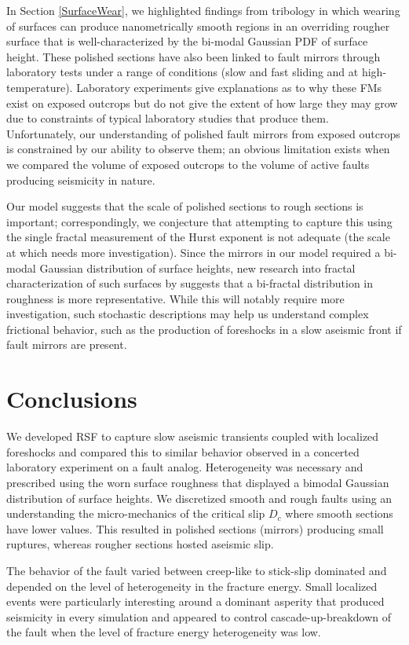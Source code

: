 \documentclass[preprint,1p, 10pt,authoryear]{elsarticle}
\begin{document}
In Section \ref{SurfaceWear}, we highlighted findings from tribology in which wearing of surfaces can produce nanometrically smooth regions in an overriding rougher surface that is well-characterized by the bi-modal Gaussian PDF of surface height. These polished sections have also been linked to fault mirrors through laboratory tests under a range of conditions (slow and fast sliding and at high-temperature). Laboratory experiments give explanations as to why these FMs exist on exposed outcrops but do not give the extent of how large they may grow due to constraints of typical laboratory studies that produce them. Unfortunately, our understanding of polished fault mirrors from exposed outcrops is constrained by our ability to observe them; an obvious limitation exists when we compared the volume of exposed outcrops to the volume of active faults producing seismicity in nature.  

Our model suggests that the scale of polished sections to rough sections is important; correspondingly, we conjecture that attempting to capture this using the single fractal measurement of the Hurst exponent is not adequate (the scale at which needs more investigation). Since the mirrors in our model required a bi-modal Gaussian distribution of surface heights, new research into fractal characterization of such surfaces by \citet{Hu2019} suggests that a bi-fractal distribution in roughness is more representative. While this will notably require more investigation, such stochastic descriptions may help us understand complex frictional behavior, such as the production of foreshocks in a slow aseismic front if fault mirrors are present.

\section{Conclusions}
We developed RSF to capture slow aseismic transients coupled with localized foreshocks and compared this to similar behavior observed in a concerted laboratory experiment on a fault analog. Heterogeneity was necessary and prescribed using the worn surface roughness that displayed a bimodal Gaussian distribution of surface heights. We discretized smooth and rough faults using an understanding the micro-mechanics of the critical slip $D_{c}$ where smooth sections have lower values. This resulted in polished sections (mirrors) producing small ruptures, whereas rougher sections hosted aseismic slip.  

The behavior of the fault varied between creep-like to stick-slip dominated and depended on the level of heterogeneity in the fracture energy. Small localized events were particularly interesting around a dominant asperity that produced seismicity in every simulation and appeared to control cascade-up-breakdown of the fault when the level of fracture energy heterogeneity was low. 
\end{document}
